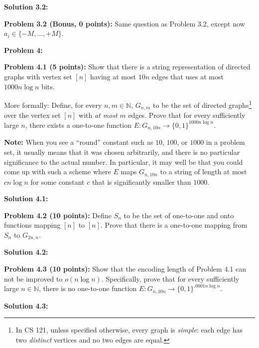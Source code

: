 \documentclass[11pt]{article}
\begin{document}
\textbf{Solution 3.2:} %

\textbf{Problem 3.2 (Bonus, 0 points):} Same question as Problem 3.2, except now $a_i \in \{-M,\ldots,+M\}$.

\textbf{Problem 4:}

\newcommand{\N}{\mathbb{N}}

\textbf{Problem 4.1 (5 points):}
Show that there is a string
representation of directed graphs with vertex set $[n]$ having at most
 $10n$ edges that uses at most $1000n \log n$ bits.

More formally: Define, for every $n,m \in \N$, $G_{n,m}$ to be the set of directed graphs\footnote{In CS 121, unless specified otherwise, every graph is \emph{simple}: each edge has two \emph{distinct} vertices and no two edges are equal.} over the vertex
set $[n]$ with {\em at most} $m$ edges. Prove that for
every sufficiently large $n$, there exists a one-to-one function $E:G_{n, 10n} \to \{0,1\}^{1000n\log n}$.

\textbf{Note:} When you see a ``round'' constant such as \(10\),
\(100\), or \(1000\) in a problem set, it usually means that it was
chosen arbitrarily, and there is no particular significance to the
actual number. In particular, it may well be that you could come up with
such a scheme where \(E\) maps \(G_{n, 10n}\) to a string of
length at most \(cn\log n\) for some constant \(c\) that is significantly
smaller than \(1000\).

\textbf{Solution 4.1:} %

\textbf{Problem 4.2 (10 points):}  Define $S_n$ to be the
set of one-to-one and onto functions mapping $[n]$ to $[n]$.
Prove that there is a one-to-one mapping from $S_n$ to $G_{2n,n}$.

\textbf{Solution 4.2:} %

\textbf{Problem 4.3 (10 points):}
Show that the encoding length of Problem 4.1 can not be improved to $o(n \log n)$. Specifically, prove that
for every sufficiently large $n\in\N$, there is no one-to-one function
$E:G_{n, 10n} \to \{0,1\}^{.0001 n \log n}$.

\textbf{Solution 4.3:} %
\end{document}
